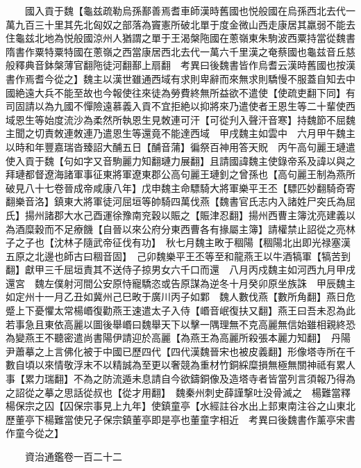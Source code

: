　　國入貢于魏【龜兹疏勒烏孫鄯善焉耆車師漢時舊國也悦般國在烏孫西北去代一萬九百三十里其先北匈奴之部落為竇憲所破北單于度金微山西走康居其羸弱不能去住龜兹北地為悦般國涼州人猶謂之單于王渴槃陁國在蔥嶺東朱駒波西粟持當從魏書隋書作粟特粟特國在蔥嶺之西當康居西北去代一萬六千里漢之奄蔡國也龜兹音丘慈般釋典音鉢槃薄官翻陁徒河翻鄯上扇翻　考異曰後魏書皆作烏耆云漢時舊國也按漢書作焉耆今從之】魏主以漢世雖通西域有求則卑辭而來無求則驕慢不服蓋自知去中國絶遠大兵不能至故也今報使往來徒為勞費終無所益欲不遣使【使疏吏翻下同】有司固請以為九國不憚險遠慕義入貢不宜拒絶以抑將來乃遣使者王恩生等二十輩使西域恩生等始度流沙為柔然所執恩生見敇連可汗【可從刋入聲汗音寒】持魏節不屈魏主聞之切責敇連敇連乃遣恩生等還竟不能達西域　甲戌魏主如雲中　六月甲午魏主以時和年豐嘉瑞沓臻詔大酺五日【酺音蒲】徧祭百神用答天貺　丙午高句麗王璉遣使入貢于魏【句如字又音駒麗力知翻璉力展翻】且請國諱魏主使錄帝系及諱以與之拜璉都督遼海諸軍事征東將軍遼東郡公高句麗王璉釗之曾孫也【高句麗王制為燕所破見八十七卷晉成帝咸康八年】戊申魏主命驃騎大將軍樂平王丕【驃匹妙翻騎奇寄翻樂音洛】鎮東大將軍徒河屈垣等帥騎四萬伐燕【魏書官氏志内入諸姓尸突氏為屈氏】揚州諸郡大水己酉運徐豫南兖穀以賑之【賑津忍翻】揚州西曹主簿沈亮建義以為酒糜穀而不足療饑【自晉以來公府分東西曹各有掾屬主簿】請權禁止詔從之亮林子之子也【沈林子隨武帝征伐有功】　秋七月魏主畋于稒陽【稒陽北出即光禄塞漢五原之北邊也師古曰稒音固】　己卯魏樂平王丕等至和龍燕王以牛酒犒軍【犒苦到翻】獻甲三千屈垣責其不送侍子掠男女六千口而還　八月丙戍魏主如河西九月甲戌還宮　魏左僕射河間公安原恃寵驕恣或告原謀為逆冬十月癸卯原坐族誅　甲辰魏主如定州十一月乙丑如冀州己巳畋于廣川丙子如鄴　魏人數伐燕【數所角翻】燕日危蹙上下憂懼太常楊㟭復勸燕王速遣太子入侍【㟭音岷復扶又翻】燕王曰吾未忍為此若事急且東依高麗以圖後舉㟭曰魏舉天下以擊一隅理無不克高麗無信始雖相親終恐為變燕王不聽密遣尚書陽伊請迎於高麗【為燕王為高麗所殺張本麗力知翻】　丹陽尹蕭摹之上言佛化被于中國已歷四代【四代漢魏晉宋也被皮義翻】形像塔寺所在千數自頃以來情敬浮末不以精誠為至更以奢競為重材竹銅綵糜損無極無關神祗有累人事【累力瑞翻】不為之防流遁未息請自今欲鑄銅像及造塔寺者皆當列言須報乃得為之詔從之摹之思話從叔也【從才用翻】　魏秦州刺史薛謹撃吐没骨滅之　楊難當釋楊保宗之囚【囚保宗事見上九年】使鎮童亭【水經註谷水出上邽東南注谷之山東北歷董亭下楊難當使兄子保宗鎮董亭即是亭也董童字相近　考異曰後魏書作薰亭宋書作童今從之】

　　資治通鑑卷一百二十二


    


 


 



